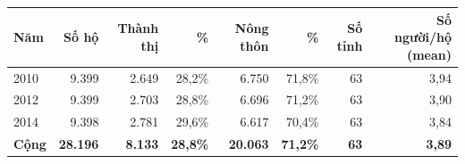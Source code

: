 \begin{tabular}{lrrrrrrr}
\toprule
Năm & Số hộ & Thành thị & \% & Nông thôn & \% & Số tỉnh & Số người/hộ (mean) \\
\midrule
2010 & 9.399 & 2.649 & 28,2\% & 6.750 & 71,8\% & 63 & 3,94 \\
2012 & 9.399 & 2.703 & 28,8\% & 6.696 & 71,2\% & 63 & 3,90 \\
2014 & 9.398 & 2.781 & 29,6\% & 6.617 & 70,4\% & 63 & 3,84 \\
\textbf{Cộng} & \textbf{28.196} & \textbf{8.133} & \textbf{28,8\%} & \textbf{20.063} & \textbf{71,2\%} & \textbf{63} & \textbf{3,89} \\
\bottomrule
\end{tabular}
